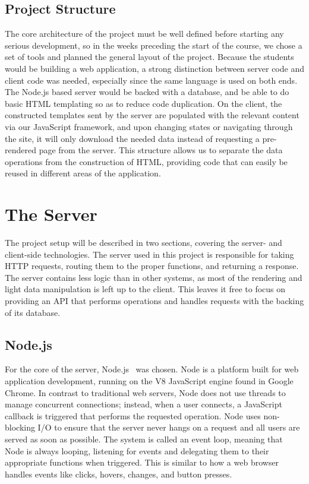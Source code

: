 \documentclass[12pt]{article}
\begin{document}
\subsection{Project Structure}\label{sec:structure}
The core architecture of the project must be well defined before starting any serious development, so in the weeks preceding the start of the course, we chose a set of tools and planned the general layout of the project. Because the students would be building a web application, a strong distinction between server code and client code was needed, especially since the same language is used on both ends. The Node.js based server would be backed with a database, and be able to do basic HTML templating so as to reduce code duplication. On the client, the constructed templates sent by the server are populated with the relevant content via our JavaScript framework, and upon changing states or navigating through the site, it will only download the needed data instead of requesting a pre-rendered page from the server. This structure allows us to separate the data operations from the construction of HTML, providing code that can easily be reused in different areas of the application.

\section{The Server}\label{sec:server}
The project setup will be described in two sections, covering the server- and client-side technologies. The server used in this project is responsible for taking HTTP requests, routing them to the proper functions, and returning a response. The server contains less logic than in other systems, as most of the rendering and light data manipulation is left up to the client. This leaves it free to focus on providing an API that performs operations and handles requests with the backing of its database.

\subsection{Node.js}\label{sec:node}
For the core of the server, Node.js~\cite{Node} was chosen. Node is a platform built for web application development, running on the V8 JavaScript engine found in Google Chrome. In contrast to traditional web servers, Node does not use threads to manage concurrent connections; instead, when a user connects, a JavaScript callback is triggered that performs the requested operation. Node uses non-blocking I/O to ensure that the server never hangs on a request and all users are served as soon as possible. The system is called an event loop, meaning that Node is always looping, listening for events and delegating them to their appropriate functions when triggered. This is similar to how a web browser handles events like clicks, hovers, changes, and button presses. 
\end{document}
